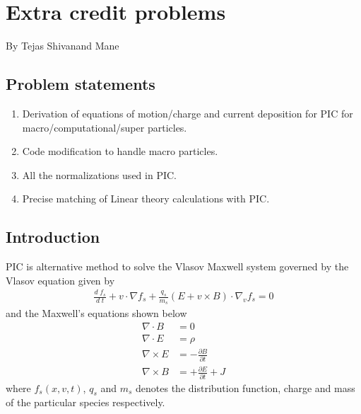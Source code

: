 \documentclass{article}
\begin{document}
\section*{Extra credit problems}
By Tejas Shivanand Mane

\subsection*{Problem statements}
\begin{enumerate}
    \item Derivation of equations of motion/charge and current deposition for PIC for macro/computational/super particles.
    \item Code modification to handle macro particles.
    \item All the normalizations used in PIC.
    \item Precise matching of Linear theory calculations with PIC.
\end{enumerate}

\subsection*{Introduction} %

PIC is alternative method to solve the Vlasov Maxwell system governed by the Vlasov equation given by
\begin{align}
\frac{d\;f_{s}}{d\;t} + v\cdot\nabla f_{s} + \frac{q_{s}}{m_{s}}(E + v \times B)\cdot \nabla_{v}f_{s} = 0 \label{v1}
\end{align}
and the Maxwell's equations shown below
\begin{align}
\nabla \cdot B &= 0  \label{m1}\\ 
\nabla \cdot E &= \rho  \label{m2}\\
\nabla \times E &= - \frac{\partial B}{\partial t}  \label{m3}\\
\nabla \times B &= + \frac{\partial E}{\partial t} + J  \label{m4}
\end{align}
where $f_{s}(x, v, t)$, $q_{s}$ and $m_{s}$ denotes the distribution function, charge and mass of the particular species respectively. 
\end{document}
